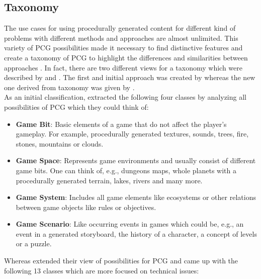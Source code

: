 \documentclass[MGS,Master,english]{twbook}%
\begin{document}
\subsection{Taxonomy}\label{PcgTaxonomy}
The use cases for using procedurally generated content for different kind of problems with different methods and approaches are almost unlimited. This variety of PCG possibilities made it necessary to find distinctive features and create a taxonomy of PCG to highlight the differences and similarities between approaches \cite{pcg::book}. In fact, there are two different views for a taxonomy which were described by \citep{pcg::survey} and \citep{pcg::book}. The first and initial approach was created by \citep{pcg::survey} whereas the new one derived from \citep{pcg::survey} taxonomy was given by \citep{pcg::book}.\\
As an initial classification, \citep{pcg::survey} extracted the following four classes by analyzing all possibilities of PCG which they could think of:
\begin{itemize}
	\item \textbf{Game Bit}: Basic elements of a game that do not affect the player's gameplay. For example, procedurally generated textures, sounds, trees, fire, stones, mountains or clouds. \cite{pcg::survey}
	\item \textbf{Game Space}: Represents game environments and usually consist of different game bits. One can think of, e.g., dungeons maps, whole planets with a procedurally generated terrain, lakes, rivers and many more. \cite{pcg::survey}
	\item \textbf{Game System}: Includes all game elements like ecosystems or other relations between game objects like rules or objectives. \cite{pcg::survey}
	\item \textbf{Game Scenario}: Like occurring events in games which could be, e.g., an event in a generated storyboard, the history of a character, a concept of levels or a puzzle. \cite{pcg::survey}
\end{itemize}
Whereas \citep{pcg::book} extended their view of possibilities for PCG and came up with the following 13 classes which are more focused on technical issues:
\end{document}
